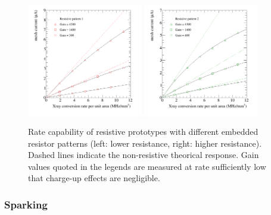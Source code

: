 \documentclass{article}
\begin{document}
\begin{figure}[h]
\begin{centering}
  \includegraphics[width=0.45\textwidth]{imesh_rate_star} 
  \includegraphics[width=0.45\textwidth]{imesh_rate_mirror}
\caption{Rate capability of resistive prototypes with different embedded resistor patterns (left: lower resistance, right: higher resistance). Dashed lines indicate the non-resistive theorical response. Gain values quoted in the legends are measured at rate sufficiently low that charge-up effects are negligible.}
\label{rateCapa}
\end{centering}
\end{figure}




\subsubsection{Sparking}
\end{document}
